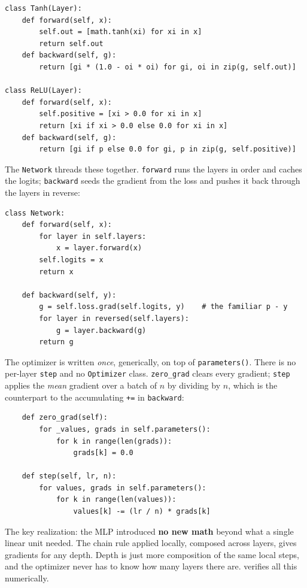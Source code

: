 \begin{lstlisting}
class Tanh(Layer):
    def forward(self, x):
        self.out = [math.tanh(xi) for xi in x]
        return self.out
    def backward(self, g):
        return [gi * (1.0 - oi * oi) for gi, oi in zip(g, self.out)]

class ReLU(Layer):
    def forward(self, x):
        self.positive = [xi > 0.0 for xi in x]
        return [xi if xi > 0.0 else 0.0 for xi in x]
    def backward(self, g):
        return [gi if p else 0.0 for gi, p in zip(g, self.positive)]
\end{lstlisting}

The \texttt{Network} threads these together. \texttt{forward} runs the
layers in order and caches the logits; \texttt{backward} seeds the
gradient from the loss and pushes it back through the layers in reverse:

\begin{lstlisting}
class Network:
    def forward(self, x):
        for layer in self.layers:
            x = layer.forward(x)
        self.logits = x
        return x

    def backward(self, y):
        g = self.loss.grad(self.logits, y)    # the familiar p - y
        for layer in reversed(self.layers):
            g = layer.backward(g)
        return g
\end{lstlisting}

The optimizer is written \emph{once}, generically, on top of
\texttt{parameters()}. There is no per-layer \texttt{step} and no
\texttt{Optimizer} class. \texttt{zero\_grad} clears every gradient;
\texttt{step} applies the \emph{mean} gradient over a batch of $n$ by
dividing by $n$, which is the counterpart to the accumulating
\texttt{+=} in \texttt{backward}:

\begin{lstlisting}
    def zero_grad(self):
        for _values, grads in self.parameters():
            for k in range(len(grads)):
                grads[k] = 0.0

    def step(self, lr, n):
        for values, grads in self.parameters():
            for k in range(len(values)):
                values[k] -= (lr / n) * grads[k]
\end{lstlisting}

The key realization: the MLP introduced \textbf{no new math} beyond what
a single linear unit needed. The chain rule applied locally, composed
across layers, gives gradients for any depth. Depth is just more
composition of the same local steps, and the optimizer never has to know
how many layers there are.  verifies all this
numerically.
